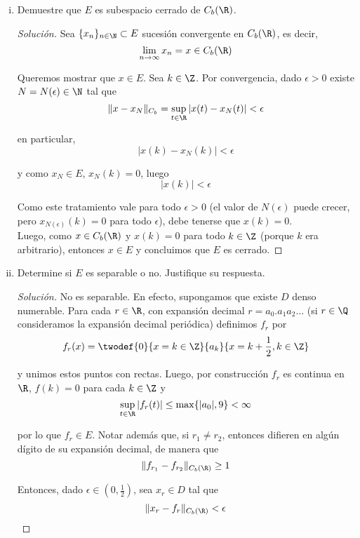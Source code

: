 \documentclass[duedate = 11 de Septiembre, 
			ramo = An\'alisis Funcional, 
			doctype = Tarea 1,
			semester = 2,
			year = 2017]{tarea}
\begin{document}
\begin{enumerate}[(i)]
	\item Demuestre que $E$ es subespacio cerrado de $C_{b}(\R)$.
	
	\begin{proof}[Solución] Sea $\{x_{n}\}_{n \in \N} \subset E$ sucesión convergente en $C_{b}(\R)$, es decir,
		$$\lim_{n \to \infty} x_{n} = x \in C_{b}(\R)$$
	
	Queremos mostrar que $x \in E$. Sea $k \in \Z$. Por convergencia, dado $\epsilon > 0$ existe $N = N(\epsilon) \in \N$ tal que
		$$\|x - x_{N}\|_{C_{b}} = \sup_{t \in \R} |x(t) - x_{N}(t)| < \epsilon$$
	
	en particular, 
		$$|x(k) - x_{N}(k)| < \epsilon$$ 
	
	y como $x_{N} \in E$, $x_{N}(k) = 0$, luego 
		$$|x(k)| < \epsilon$$
	
	Como este tratamiento vale para todo $\epsilon > 0$ (el valor de $N(\epsilon)$ puede crecer, pero $x_{N(\epsilon)}(k) = 0$ para todo $\epsilon$), debe tenerse que $x(k) = 0$.	\\
	
	Luego, como $x \in C_{b}(\R)$ y $x(k) =0 $ para todo $k \in \Z$ (porque $k$ era arbitrario), entonces $x \in E$ y concluimos que $E$ es cerrado.
	\end{proof}
	
	\newpage
	\item Determine si $E$ es separable o no. Justifique su respuesta.
	
	\begin{proof}[Solución] No es separable. En efecto, supongamos que existe $D$ denso numerable. Para cada $r \in \R$, con expansión decimal $r = a_{0}.a_{1}a_{2}\ldots$ (si $r \in \Q$ consideramos la expansión decimal periódica) definimos $f_{r}$ por
		$$f_{r}(x) = \twodef{0}{x = k \in \Z}
						{a_{k}}{x = k + \frac{1}{2}, k \in \Z}$$
					
	y unimos estos puntos con rectas. Luego, por construcción $f_{r}$ es continua en $\R$, $f(k) = 0$ para cada $k \in \Z$ y
		$$\sup_{t \in \R} |f_{r}(t)| \leq \max\{|a_{0}|,9\} < \infty$$
	
	por lo que $f_{r} \in E$. Notar además que, si $r_{1} \neq r_{2}$, entonces difieren en algún dígito de su expansión decimal, de manera que
		$$\|f_{r_{1}} - f_{r_{2}}\|_{C_{b}(\R)} \geq 1$$
	
	Entonces, dado $\epsilon \in \left(0,\frac{1}{2}\right)$, sea $x_{r} \in D$ tal que
		$$\|x_{r} - f_{r}\|_{C_{b}(\R)} < \epsilon $$
		

\end{proof}
\end{enumerate}
\end{document}

